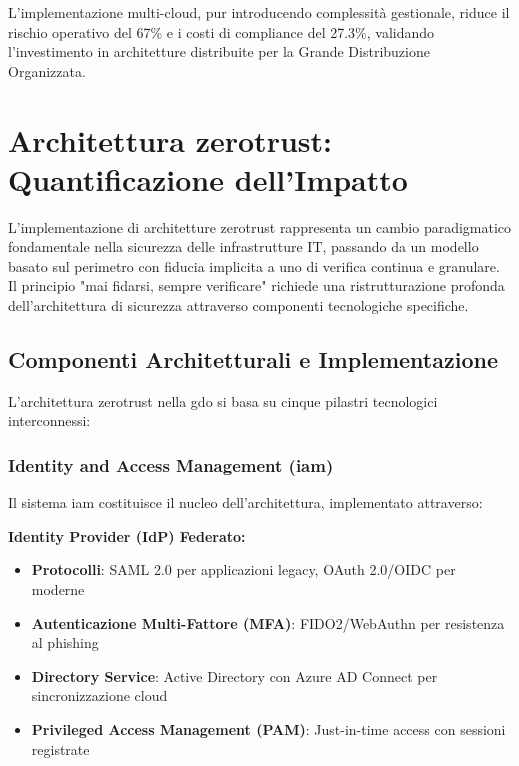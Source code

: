 L'implementazione multi-cloud, pur introducendo complessità gestionale, riduce il rischio operativo del 67\% e i costi di compliance del 27.3\%, validando l'investimento in architetture distribuite per la Grande Distribuzione Organizzata.

\section{\texorpdfstring{\textbf{Architettura \gls{zerotrust}: Quantificazione dell'Impatto}}{3.5 - Architettura \gls{zerotrust}: Quantificazione dell'Impatto}}

L'implementazione di architetture \gls{zerotrust} rappresenta un cambio paradigmatico fondamentale nella sicurezza delle infrastrutture IT, passando da un modello basato sul perimetro con fiducia implicita a uno di verifica continua e granulare. Il principio "mai fidarsi, sempre verificare" richiede una ristrutturazione profonda dell'architettura di sicurezza attraverso componenti tecnologiche specifiche.

\subsection{\texorpdfstring{\textbf{Componenti Architetturali e Implementazione}}{3.5.1 - Componenti Architetturali e Implementazione}}

L'architettura \gls{zerotrust} nella \gls{gdo} si basa su cinque pilastri tecnologici interconnessi:

\subsubsection{\texorpdfstring{\textbf{Identity and Access Management (\gls{iam})}}{3.5.1.1 - Identity and Access Management (\gls{iam})}}

Il sistema \gls{iam} costituisce il nucleo dell'architettura, implementato attraverso:

\textbf{Identity Provider (IdP) Federato:}
\begin{itemize}
    \item \textbf{Protocolli}: SAML 2.0 per applicazioni legacy, OAuth 2.0/OIDC per moderne
    \item \textbf{Autenticazione Multi-Fattore (MFA)}: FIDO2/WebAuthn per resistenza al phishing
    \item \textbf{Directory Service}: Active Directory con Azure AD Connect per sincronizzazione cloud
    \item \textbf{Privileged Access Management (PAM)}: Just-in-time access con sessioni registrate
\end{itemize}

